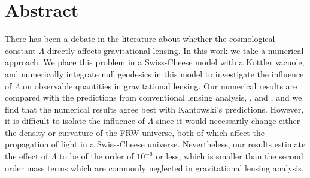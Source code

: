 \chapter*{\centering Abstract}

There has been a debate in the literature about whether the cosmological constant $\Lambda$ directly affects gravitational lensing. In this work we take a numerical approach. We place this problem in a Swiss-Cheese model with a Kottler vacuole, and numerically integrate null geodesics in this model to investigate the influence of $\Lambda$ on observable quantities in gravitational lensing. Our numerical results are compared with the predictions from conventional lensing analysis, \citet{rindler2007contribution}, and \citet{kantowski2010gravitational}, and we find that the numerical results agree best with Kantowski's predictions. However, it is difficult to isolate the influence of $\Lambda$ since it would necessarily change either the density or curvature of the FRW universe, both of which affect the propagation of light in a Swiss-Cheese universe. Nevertheless, our results estimate the effect of $\Lambda$ to be of the order of $10^{-6}$ or less, which is smaller than the second order mass terms which are commonly neglected in gravitational lensing analysis. 